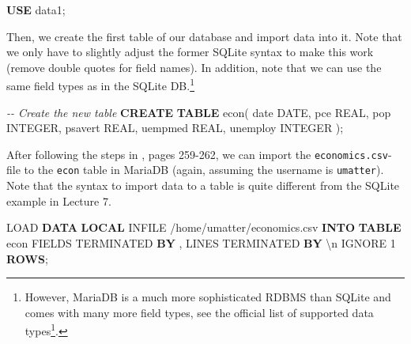 \documentclass[
  12pt,
]{style/krantz}
\newenvironment{Shaded}{\begin{snugshade}}{\end{snugshade}}
\newcommand{\CharTok}[1]{\textcolor[rgb]{0.31,0.60,0.02}{#1}}
\newcommand{\CommentTok}[1]{\textcolor[rgb]{0.56,0.35,0.01}{\textit{#1}}}
\newcommand{\DataTypeTok}[1]{\textcolor[rgb]{0.13,0.29,0.53}{#1}}
\newcommand{\DecValTok}[1]{\textcolor[rgb]{0.00,0.00,0.81}{#1}}
\newcommand{\KeywordTok}[1]{\textcolor[rgb]{0.13,0.29,0.53}{\textbf{#1}}}
\newcommand{\NormalTok}[1]{#1}
\newcommand{\StringTok}[1]{\textcolor[rgb]{0.31,0.60,0.02}{#1}}
\renewcommand{\href}[2]{#2\footnote{\url{#1}}}
\begin{document}
\begin{Shaded}
\begin{Highlighting}[]
\KeywordTok{USE}\NormalTok{ data1;}
\end{Highlighting}
\end{Shaded}

Then, we create the first table of our database and import data into it. Note that we only have to slightly adjust the former SQLite syntax to make this work (remove double quotes for field names). In addition, note that we can use the same field types as in the SQLite DB.\footnote{However, MariaDB is a much more sophisticated RDBMS than SQLite and comes with many more field types, see the official \href{https://mariadb.com/kb/en/library/data-types/}{list of supported data types}.}

\begin{Shaded}
\begin{Highlighting}[]
\CommentTok{{-}{-} Create the new table}
\KeywordTok{CREATE} \KeywordTok{TABLE}\NormalTok{ econ(}
\DataTypeTok{date} \DataTypeTok{DATE}\NormalTok{,}
\NormalTok{pce }\DataTypeTok{REAL}\NormalTok{,}
\NormalTok{pop }\DataTypeTok{INTEGER}\NormalTok{,}
\NormalTok{psavert }\DataTypeTok{REAL}\NormalTok{,}
\NormalTok{uempmed }\DataTypeTok{REAL}\NormalTok{,}
\NormalTok{unemploy }\DataTypeTok{INTEGER}
\NormalTok{);}
\end{Highlighting}
\end{Shaded}

After following the steps in \citet{walkowiak_2016}, pages 259-262, we can import the \texttt{economics.csv}-file to the \texttt{econ} table in MariaDB (again, assuming the username is \texttt{umatter}). Note that the syntax to import data to a table is quite different from the SQLite example in Lecture 7.

\begin{Shaded}
\begin{Highlighting}[]
\NormalTok{LOAD }\KeywordTok{DATA} \KeywordTok{LOCAL}\NormalTok{ INFILE}
\StringTok{\textquotesingle{}/home/umatter/economics.csv\textquotesingle{}} 
\KeywordTok{INTO} \KeywordTok{TABLE}\NormalTok{ econ}
\NormalTok{FIELDS TERMINATED }\KeywordTok{BY} \StringTok{\textquotesingle{},\textquotesingle{}}
\NormalTok{LINES TERMINATED }\KeywordTok{BY} \StringTok{\textquotesingle{}}\CharTok{\textbackslash{}n}\StringTok{\textquotesingle{}}
\NormalTok{IGNORE }\DecValTok{1} \KeywordTok{ROWS}\NormalTok{;}
\end{Highlighting}
\end{Shaded}
\end{document}

